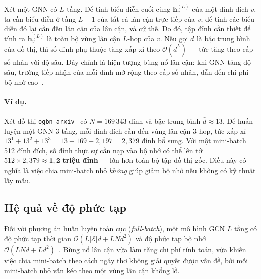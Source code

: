 Xét một GNN có $L$ tầng. Để tính biểu diễn cuối cùng $\mathbf{h}_v^{(L)}$ của một đỉnh đích $v$, ta cần biểu diễn ở tầng $L-1$ của tất cả lân cận trực tiếp của $v$; để tính các biểu diễn đó lại cần đến lân cận của lân cận, và cứ thế. Do đó, tập đỉnh cần thiết để tính ra $\mathbf{h}_v^{(L)}$ là toàn bộ vùng lân cận $L$-hop của $v$. Nếu gọi $\bar{d}$ là bậc trung bình của đồ thị, thì số đỉnh phụ thuộc tăng xấp xỉ theo $\mathcal{O}(\bar{d}^{L})$ --- tức tăng theo cấp số nhân với độ sâu. Đây chính là hiện tượng bùng nổ lân cận: khi GNN tăng độ sâu, trường tiếp nhận của mỗi đỉnh mở rộng theo cấp số nhân, dẫn đến chi phí bộ nhớ cao~\cite{Younesian2023GRAPES}.

\paragraph{Ví dụ.} Xét đồ thị \texttt{ogbn-arxiv}~\cite{Hu2020OGB} có $N = 169\,343$ đỉnh và bậc trung bình $\bar{d} \approx 13$. Để huấn luyện một GNN 3 tầng, mỗi đỉnh đích cần đến vùng lân cận 3-hop, tức xấp xỉ $13^1 + 13^2 + 13^3 = 13 + 169 + 2{,}197 = 2{,}379$ đỉnh bổ sung. Với một mini-batch 512 đỉnh đích, số đỉnh thực sự cần nạp vào bộ nhớ có thể lên tới $512 \times 2{,}379 \approx \mathbf{1{,}2}$ \textbf{triệu đỉnh} --- lớn hơn toàn bộ tập đồ thị gốc. Điều này có nghĩa là việc chia mini-batch nhỏ \textit{không} giúp giảm bộ nhớ nếu không có kỹ thuật lấy mẫu.

\subsection{Hệ quả về độ phức tạp}

Đối với phương án huấn luyện toàn cục (\textit{full-batch}), một mô hình GCN $L$ tầng có độ phức tạp thời gian $\mathcal{O}(L|\mathcal{E}|d + LN d^{2})$ và độ phức tạp bộ nhớ $\mathcal{O}(LNd + Ld^{2})$~\cite{Chiang2019ClusterGCN}. Bùng nổ lân cận vừa làm tăng chi phí tính toán, vừa khiến việc chia mini-batch theo cách ngây thơ không giải quyết được vấn đề, bởi mỗi mini-batch nhỏ vẫn kéo theo một vùng lân cận khổng lồ.

